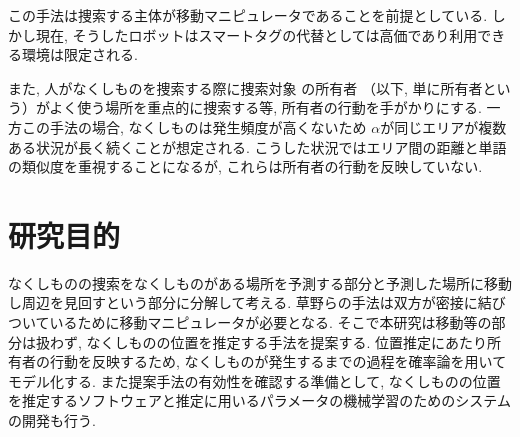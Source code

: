 この手法は捜索する主体が移動マニピュレータであることを前提としている. 
しかし現在, そうしたロボットはスマートタグの代替としては高価であり利用できる環境は限定される. 

また, 人がなくしものを捜索する際に捜索対象
の所有者
（以下, 単に所有者という）がよく使う場所を重点的に捜索する等, 
所有者の行動を手がかりにする. 
一方この手法の場合, なくしものは発生頻度が高くないため
$\alpha$が同じエリアが複数ある状況が長く続くことが想定される. 
こうした状況ではエリア間の距離と単語の類似度を重視することになるが, これらは所有者の行動を反映していない. 


\section{研究目的}
なくしものの捜索をなくしものがある場所を予測する部分と予測した場所に移動し周辺を見回すという部分に分解して考える. 
草野らの手法は双方が密接に結びついているために移動マニピュレータが必要となる. 
そこで本研究は移動等の部分は扱わず, なくしものの位置を推定する手法を提案する. 
位置推定にあたり所有者の行動を反映するため, なくしものが発生するまでの過程を確率論を用いてモデル化する. 
また提案手法の有効性を確認する準備として, なくしものの位置を推定するソフトウェアと推定に用いるパラメータの機械学習のためのシステムの開発も行う. 
